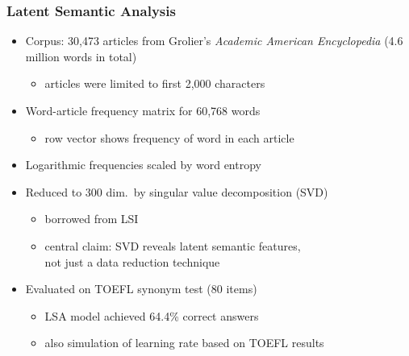 \documentclass[t]{beamer} %
\begin{document}
\begin{frame}
  \frametitle{Latent Semantic Analysis \citep{Landauer:Dumais:97}}

  \begin{itemize}
  \item Corpus: 30,473 articles from Grolier's \emph{Academic American Encyclopedia} (4.6 million words in total)
    \begin{itemize}
    \item[\hand] articles were limited to first 2,000 characters
    \end{itemize}
  \item Word-article frequency matrix for 60,768 words
    \begin{itemize}
    \item row vector shows frequency of word in each article
    \end{itemize}
  \item Logarithmic frequencies scaled by word entropy
  \item Reduced to 300 dim.\ by singular value decomposition (SVD)
    \begin{itemize}
    \item borrowed from LSI \citep{Dumais:etc:88}
    \item[\hand] central claim: SVD reveals latent semantic features,\\
      not just a data reduction technique
    \end{itemize}
  \item Evaluated on TOEFL synonym test (80 items)
    \begin{itemize}
    \item LSA model achieved 64.4\% correct answers
    \item also simulation of learning rate based on TOEFL results
    \end{itemize}
  \end{itemize}
\end{frame}
\end{document}
